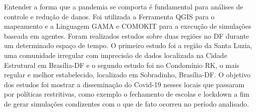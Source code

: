 
Entender a forma que a pandemia se comporta é fundamental para análises de controle e redução de danos. Foi utilizada a Ferramenta QGIS para o mapeamento e a Linguagem GAMA e COMOKIT para a execução de simulações baseada em agentes. Foram realizados estudos sobre duas regiões no DF durante um determinado espaço de tempo. O primeiro estudo foi a região da Santa Luzia, uma comunidade irregular com imprecisão de dados localizada na Cidade Estrutural em Brasília-DF e o segundo estudo foi no Condomínio RK, o mais regular e melhor estabelecido, localizado em Sobradinho, Brasília-DF. O objetivo dos estudos foi mostrar a disseminação do Covid-19 nesses locais que passaram por políticas restritivas, como exemplo o fechamento de escolas e lockdown a fim de gerar simulações condizentes com o que de fato ocorreu no período analisado.

